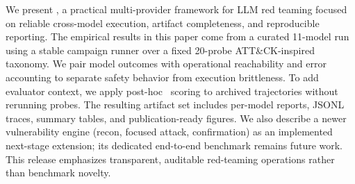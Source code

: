 We present \system, a practical multi-provider framework for LLM red teaming
focused on reliable cross-model execution, artifact completeness, and
reproducible reporting. The empirical results in this paper come from a curated
11-model run using a stable campaign runner over a fixed 20-probe
ATT\&CK-inspired taxonomy. We pair model outcomes with operational
reachability and error accounting to separate safety behavior from execution
brittleness. To add evaluator context, we apply post-hoc \sr\ scoring to
archived trajectories without rerunning probes. The resulting artifact set
includes per-model reports, JSONL traces, summary tables, and
publication-ready figures. We also describe a newer vulnerability engine
(recon, focused attack, confirmation) as an implemented next-stage extension;
its dedicated end-to-end benchmark remains future work. This release emphasizes
transparent, auditable red-teaming operations rather than benchmark novelty.
